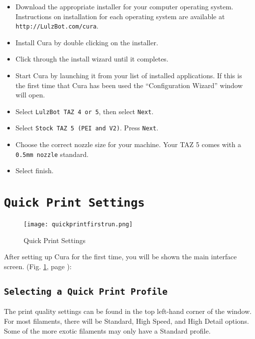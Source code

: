 \begin{itemize}
\item Download the appropriate installer for your computer operating system. Instructions on installation for each operating system are available at \texttt{http://LulzBot.com/cura}.
\item Install Cura by double clicking on the installer.
\item Click through the install wizard until it completes.
\item Start Cura by launching it from your list of installed applications. If this is the first time that Cura has been used the ``Configuration Wizard'' window will open.
\item Select \texttt{LulzBot\textsuperscript{\miniscule{\textregistered}} TAZ 4 or 5}, then select \texttt{Next}.
\item Select \texttt{Stock TAZ 5 (PEI and V2)}. Press \texttt{Next}.
\item Choose the correct nozzle size for your machine. Your TAZ 5 comes with a \texttt{0.5mm nozzle} standard.
\item Select finish.
\end{itemize}




\section{\texttt{Quick Print Settings}}
\begin{figure}[H]
\centering
\texttt{[image: quickprintfirstrun.png]}
\caption{Quick Print Settings}
\label{fig:Cura}
\end{figure} 
After setting up Cura for the first time, you will be shown the main interface screen. (Fig. \ref{fig:Cura}, page \pageref{fig:Cura}): 

\subsection{\texttt{Selecting a Quick Print Profile}}
The print quality settings can be found in the top left-hand corner of the window. For most filaments, there will be Standard, High Speed, and High Detail options. Some of the more exotic filaments may only have a Standard profile.

